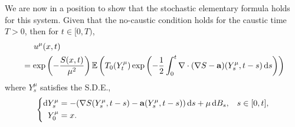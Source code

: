 \documentclass[a4paper,12pt,draft]{report}
\begin{document}
We are now in a position to show that the stochastic elementary formula holds for this system.
\theorem
{
Given that the no-caustic condition holds for the caustic time $T > 0$, then for $t \in [0, T)$,
\begin{align}
& \hspace{0.5cm} u^\mu(x, t)\nonumber\\
& = \exp\left(-\frac{S(x, t)}{\mu^2}\right)\mathbb{E}\left(T_0(Y_t^\mu)\exp\left(-\frac{1}{2}\int_0^t\nabla\cdot(\nabla S - \mathbf{a})(Y_s^\mu, t - s)\,\mathrm{d}s\right)\right) \label{SEF2}
\end{align}
where $Y_s^\mu$ satisfies the S.D.E.,
$$
\left\{
\begin{aligned}
\mathrm{d}Y_s^\mu & = -(\nabla S(Y_s^\mu, t - s) - \mathbf{a}(Y_s^\mu, t - s))\,\mathrm{d}s + \mu\,\mathrm{d}B_s, \hspace{0.3cm} s \in [0, t],\\
Y_0^\mu & = x.
\end{aligned}
\right.
$$
}
\proof
\end{document}
